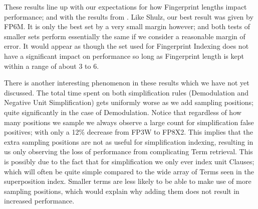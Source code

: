 These results line up with our expectations for how Fingerprint lengths impact
performance; and with the results from \cite{shulz12}. Like Shulz, our best result
was given by FP6M. It is only the best set by a very small margin however; and
both tests of smaller sets perform essentially the same if we consider a reasonable
margin of error. It would appear as though the set used for Fingerprint Indexing
does not have a significant impact on performance so long as Fingerprint length
is kept within a range of about 3 to 6.

There is another interesting phenomenon in these results which we have not yet discussed.
The total time spent on both simplification rules
(Demodulation and Negative Unit Simplification) gets uniformly worse as we add
sampling positions; quite significantly in the case of Demodulation. Notice that
regardless of how many positions we sample we always observe a large count for 
simplification false positives; with only a 12\% decrease from FP3W to FP8X2.
This implies that the extra sampling positions are not as useful for simplification
indexing, resulting in us only observing the loss of performance from complicating
Term retrieval. This is possibly due to the fact that for simplification we
only ever index unit Clauses; which will often be quite simple compared to the
wide array of Terms seen in the superposition index. Smaller terms are less likely
to be able to make use of more sampling positions, which would explain why adding
them does not result in increased performance.

